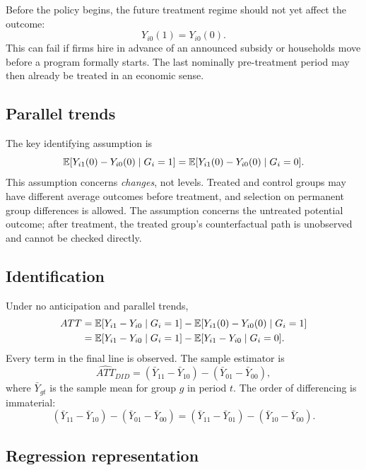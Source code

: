 Before the policy begins, the future treatment regime should not yet affect the
outcome:
\begin{equation}
  Y_{i0}(1)=Y_{i0}(0).
  \label{eq:did-no-anticipation-simple}
\end{equation}
This can fail if firms hire in advance of an announced subsidy or households
move before a program formally starts.  The last nominally pre-treatment period
may then already be treated in an economic sense.

\subsection{Parallel trends}

The key identifying assumption is
\begin{equation}
  \mathbb{E}[Y_{i1}(0)-Y_{i0}(0)\mid G_i=1]
  =\mathbb{E}[Y_{i1}(0)-Y_{i0}(0)\mid G_i=0].
  \label{eq:did-parallel-simple}
\end{equation}
This assumption concerns \emph{changes}, not levels.  Treated and control
groups may have different average outcomes before treatment, and selection on
permanent group differences is allowed.  The assumption concerns the untreated
potential outcome; after treatment, the treated group's counterfactual path is
unobserved and cannot be checked directly.

\subsection{Identification}

Under no anticipation and parallel trends,
\begin{align}
  ATT
  &=\mathbb{E}[Y_{i1}-Y_{i0}\mid G_i=1]
    -\mathbb{E}[Y_{i1}(0)-Y_{i0}(0)\mid G_i=1]\notag\\
  &=\mathbb{E}[Y_{i1}-Y_{i0}\mid G_i=1]
    -\mathbb{E}[Y_{i1}-Y_{i0}\mid G_i=0].
  \label{eq:did-identification-simple}
\end{align}
Every term in the final line is observed.  The sample estimator is
\begin{equation}
  \widehat{ATT}_{DID}
  =(\bar Y_{11}-\bar Y_{10})-(\bar Y_{01}-\bar Y_{00}),
  \label{eq:did-estimator-simple}
\end{equation}
where $\bar Y_{gt}$ is the sample mean for group $g$ in period $t$.  The order
of differencing is immaterial:
\[
  (\bar Y_{11}-\bar Y_{10})-(\bar Y_{01}-\bar Y_{00})
  =(\bar Y_{11}-\bar Y_{01})-(\bar Y_{10}-\bar Y_{00}).
\]

\subsection{Regression representation}

